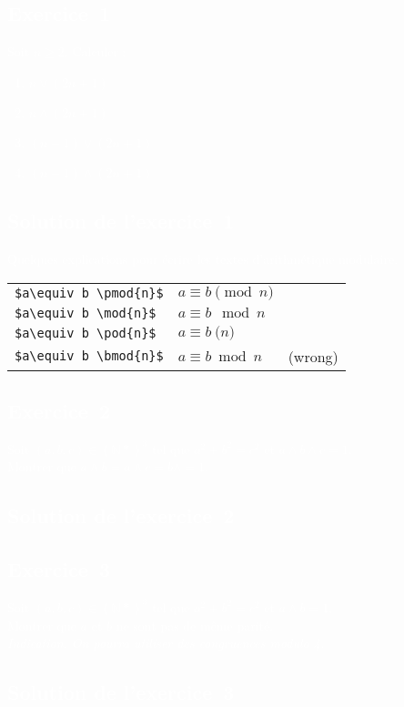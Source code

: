\documentclass[a4paper,14pt]{extarticle} %
\def\eclaire{\mathbb}
\def\N{\ensuremath{\eclaire N}}
\begin{document}
 

\pagecolor{gray}

\setlength{\parindent}{0pt}



\textcolor{white}{\section*{Exercice~1}}

\textcolor{white}{Soit $n\geqslant 2$. Calculer :
\begin{enumerate}
\item $n \vee (2n+1)$
\item $n \wedge (2n+1)$
\item $(n-1)\vee(2n+1)$
\item $(n-1)\wedge(2n+1)$
\end{enumerate}
}

\textcolor{white}{\subsection*{Solution de l'exercice~1}}

\textcolor{white}{Quelques explications pour écrire les textes d'arithmétique modulaire.}

\begin{tabular}{lll}
\verb|$a\equiv b \pmod{n}$| & $a\equiv b \pmod{n}$ \\
\verb|$a\equiv b \mod{n}$|  & $a\equiv b \mod{n}$ \\
\verb|$a\equiv b \pod{n}$|  & $a\equiv b \pod{n}$ \\
\verb|$a\equiv b \bmod{n}$| & $a\equiv b \bmod{n}$ & (wrong) 
\end{tabular}


\textcolor{white}{\section*{Exercice~2}}

\textcolor{white}{Soit $(a,b,c) \in (\N*)^3$ tel que $a^2+b^2=c^2$ et $ a \wedge b \wedge c =1$.\\ Montrer que $a \wedge b = a \wedge c = b \wedge =1$.}

\textcolor{white}{\subsection*{Solution de l'exercice~2}}



\textcolor{white}{\section*{Exercice~3}}

\textcolor{white}{Soit $(a,b,c) \in (\N*)^3$ tel que $a^2+b^2=c^2$ et $ a \wedge b =1$.\\ Montrer que $a$ et $ b$ ne sont pas de même parité.\\
\textsl{Indication. On pourra utiliser des congruences modulo 4.}}


\textcolor{white}{\subsection*{Solution de l'exercice~3}}
\end{document}
